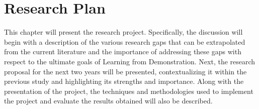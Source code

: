 \chapter{Research Plan}
\label{chapter:research_plan}
This chapter will present the research project. Specifically, the discussion will begin with a description of the various research gaps that can be extrapolated from the current literature and the importance of addressing these gaps with respect to the ultimate goals of Learning from Demonstration. Next, the research proposal for the next two years will be presented, contextualizing it within the previous study and highlighting its strengths and importance. Along with the presentation of the project, the techniques and methodologies used to implement the project and evaluate the results obtained will also be described.


